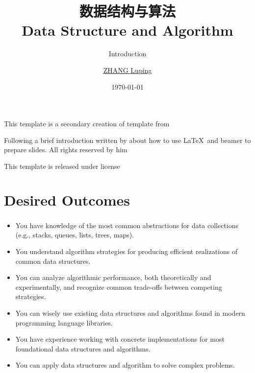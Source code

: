\documentclass{sintefbeamer}
\title{数据结构与算法\\ Data Structure and Algorithm}
\subtitle{Introduction}
\author{\href{mailto:zlp@upc.edu.cn}{ZHANG Luping}}
\date{\today}
\begin{document}
\maketitle

\begin{frame}

  This template is a secondary creation of  template from  \vspace{\baselineskip}

  Following a brief introduction written by  about how to use \LaTeX\ and beamer to prepare slides. All rights reserved by him\vspace{\baselineskip}

  This template is released under  license

\end{frame}

\section{Desired Outcomes}

\begin{frame}
  \frametitle{}

  \begin{itemize}
    \item You have knowledge of the most common abstractions for data collections (e.g., stacks, queues, lists, trees, maps).
    \item You understand algorithm strategies for producing efficient realizations of common data structures.
    \item You can analyze algorithmic performance, both theoretically and experimentally, and recognize common trade-offs between competing strategies.
    \item You can wisely use existing data structures and algorithms found in modern programming language libraries.
    \item You have experience working with concrete implementations for most foundational data structures and algorithms.
    \item You can apply data structures and algorithm to solve complex problems.
  \end{itemize}

\end{frame}
\end{document}
